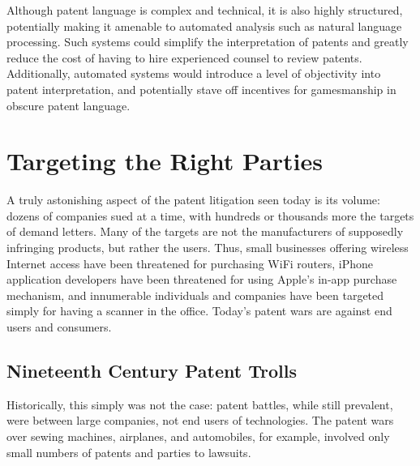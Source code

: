 \documentclass[11pt,twocolumn,titlepage]{article}
\begin{document}
Although patent language is complex and
technical, it is also highly structured, potentially making it amenable to
automated analysis such as natural language processing. Such systems could
simplify the interpretation of patents and greatly reduce the cost of having to
hire experienced counsel to review patents. Additionally, automated systems
would introduce a level of objectivity into patent interpretation, and
potentially stave off incentives for gamesmanship in obscure patent
language.


\section{Targeting the Right Parties}
\SectionNote
{}
 
A truly astonishing aspect of the patent litigation seen today is its volume:
dozens of companies sued at a time, with hundreds or thousands more the targets
of demand letters. Many of the targets are not the manufacturers of supposedly
infringing products, but rather the users. Thus, small businesses offering
wireless Internet access have been threatened for purchasing WiFi
routers,
iPhone
application developers have been threatened for using Apple's in-app purchase
mechanism,
and innumerable individuals and companies have been targeted simply
for having a scanner in the office.
Today's patent wars are against end users
and consumers.

\subsection{Nineteenth Century Patent Trolls}
\SectionNote
{}

Historically, this simply was not the case: patent battles, while still
prevalent, were between large companies, not end users of technologies. The
patent wars over sewing machines, airplanes, and automobiles, for example,
involved only small numbers of patents and parties to lawsuits.
\end{document}
